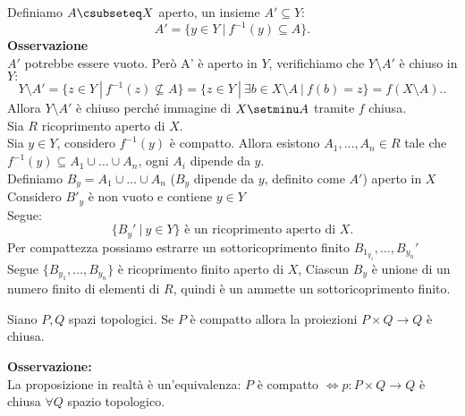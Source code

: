 \documentclass[12px]{article}
\begin{document}
 \begin{dimo}
	 Definiamo $A\csubseteq X$ aperto, un insieme  $A'\subseteq Y:$
	  \[
		  A' = \{y\in Y\ | \ f^{-1}(y)\subseteq A\}
	 .\] 
\textbf{Osservazione }\\
$A'$ potrebbe essere vuoto. Però A' è aperto in $Y$, verifichiamo che $Y\setminus A'$ è chiuso in $Y:$\\
 \[
	 Y\setminus A' = \{z\in Y\ | \ f^{-1}(z)\not\subseteq A\} = \{z\in Y\ | \ \exists b\in X\setminus A \ | \ f(b) = z\} = f(X\setminus A).
.\] 
Allora $Y\setminus A'$ è chiuso perché immagine di $X\setminu A$  tramite $f$ chiusa.\\
Sia $R$ ricoprimento aperto di $X$.\\
Sia  $y\in Y$, considero  $f^{-1}(y)$ è compatto. Allora esistono  $A_1,\ldots,A_n\in R$ tale che $f^{-1}(y)\subseteq A_1\cup\ldots\cup A_n$, ogni $A_i$ dipende da $y$.\\
Definiamo  $B_y = A_1\cup\ldots\cup A_n$ ($B_y$ dipende da $y$, definito come $A'$) aperto in $X$\\
Considero $B'_y$ è non vuoto e contiene $y\in Y$ \\
Segue:
\[
	\{B_y'\ | \ y\in Y\}\text{ è un ricoprimento aperto di } X
.\] 
Per compattezza possiamo estrarre un sottoricoprimento finito $B_1_{y_1},\ldots,B_{y_n}'$\\
Segue $\{B_{y_1},\ldots,B_{y_n}\}$ è ricoprimento finito aperto di $X$, Ciascun  $B_y$ è unione di un numero finito di elementi di $R$, quindi è un ammette un sottoricoprimento finito.
\end{dimo}
\begin{prop}
	Siano $P,Q$ spazi topologici. Se  $P$ è compatto allora la proiezioni $P\times Q \rightarrow Q$ è chiusa.
\end{prop}
\textbf{Osservazione:}\\
La proposizione in realtà è un'equivalenza: $P$ è compatto $ \Leftrightarrow p :P\times Q  \rightarrow Q$ è chiusa $\forall Q $ spazio topologico.
\end{document}
